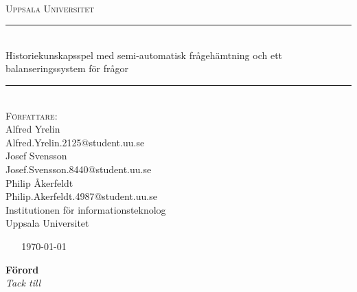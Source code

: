 \documentclass[a4paper, 11pt]{article}
\begin{document}
\begin{titlepage}
\newcommand{\HRule}{\rule{\linewidth}{0.5mm}}
\begin{center}

\textsc{\Large }\\[2.5cm]
\textsc{\LARGE Uppsala Universitet}\\[1.5cm] 

\HRule \\[0.3cm]
{ \huge \textup {Historiekunskapsspel med semi-automatisk frågehämtning och ett balanseringssystem för frågor}}\\[0.3cm]
\HRule \\[1.5cm]

\Large \textsc{Författare:}\\[0.5cm]
\large \textup{Alfred Yrelin}\\
\large \textup{Alfred.Yrelin.2125@student.uu.se}\\ [0.2cm]
\large \textup{Josef Svensson}\\
\large \textup{Josef.Svensson.8440@student.uu.se}\\[0.2cm]
\large \textup{Philip Åkerfeldt}\\
\large \textup{Philip.Akerfeldt.4987@student.uu.se}\\[0.5cm]

\large \textup{\textup{Institutionen för informationsteknolog}}\\
\large \textup{\textup{Uppsala Universitet}}\\[0.6cm]
\end{center}
~ \hfill
\center
~
{\Large \today}\\[2cm]
\vfill

\end{titlepage}

\newpage

\begin{center}
\textbf{Förord}\\
\textit{Tack till}
\end{center}
\newpage
\tableofcontents
\pagebreak

\end{document}

